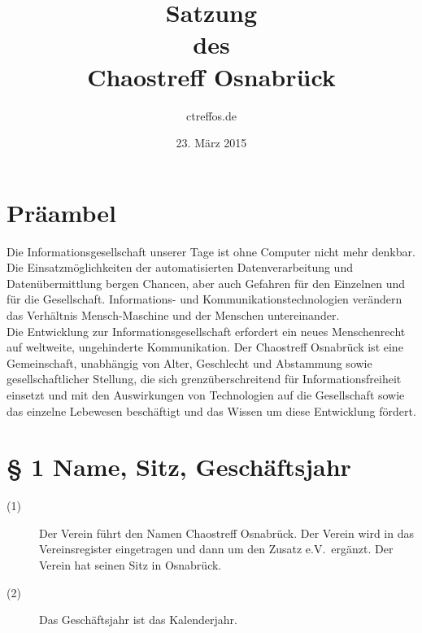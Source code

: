 \documentclass[12pt,paper=a4,ngerman]{scrreprt}
\title{Satzung\\des\\Chaostreff Osnabrück} \author{ctreffos.de}
\date{23. März 2015}
\begin{document}
\maketitle
\tableofcontents
\newpage
\section{Präambel}
Die Informationsgesellschaft unserer Tage ist ohne Computer nicht mehr denkbar. Die Einsatzmöglichkeiten der automatisierten Datenverarbeitung und Datenübermittlung bergen Chancen, aber auch Gefahren für den Einzelnen und für die Gesellschaft. Informations- und Kommunikationstechnologien verändern das Verhältnis Mensch-Maschine und der Menschen untereinander.\\
Die Entwicklung zur Informationsgesellschaft erfordert ein neues Menschenrecht auf weltweite, ungehinderte Kommunikation. Der Chaostreff Osnabrück ist eine Gemeinschaft, unabhängig von Alter, Geschlecht und Abstammung sowie gesellschaftlicher Stellung, die sich grenzüberschreitend für Informationsfreiheit einsetzt und mit den Auswirkungen von Technologien auf die Gesellschaft sowie das einzelne Lebewesen beschäftigt und das Wissen um diese Entwicklung fördert.
\section{\S{} 1 Name, Sitz, Geschäftsjahr}
\begin{description}
	\item[(1)] Der Verein führt den Namen \glqq Chaostreff Osnabrück\grqq. Der Verein wird in das Vereinsregister eingetragen und dann um den Zusatz \glqq e.V.\grqq ~ergänzt. Der Verein hat seinen Sitz in Osnabrück.
	\item[(2)] Das Geschäftsjahr ist das Kalenderjahr.
\end{description}
\end{document}

